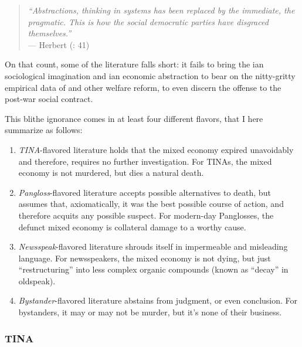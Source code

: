 \begin{quote}
	\emph{``Abstractions, thinking in systems has been replaced by the immediate, the pragmatic. This is how the social democratic parties have disgraced themselves.''}\\
	--- Herbert \citeauthor{Schui2009} (\citeyear{Schui2009}: 41)
\end{quote}

On that count, some of the literature falls short: it fails to bring the \citeauthor{Mills-1959-aa}ian sociological imagination and \citeauthor{Keynes1936}ian economic abstraction to bear on the nitty-gritty empirical data of  and other welfare reform, to even discern  the offense to the post-war social contract. %

This blithe ignorance comes in at least four different flavors, that I here summarize as follows:
\begin{enumerate}
	\item \emph{TINA}-flavored literature holds that the mixed economy expired unavoidably and therefore, requires no further investigation. For TINAs, the mixed economy is not murdered, but dies a natural death.
	\item \emph{Pangloss}-flavored literature accepts possible alternatives to death, but assumes that, axiomatically, it was the best possible course of action, and therefore acquits any possible suspect. For modern-day Panglosses, the defunct mixed economy is collateral damage to a worthy cause.
	\item \emph{Newsspeak}-flavored literature shrouds itself in impermeable and misleading language. For newsspeakers, the mixed economy is not dying, but just ``restructuring'' into less complex organic compounds (known as ``decay'' in oldspeak).
	\item \emph{Bystander}-flavored literature abstains from judgment, or even conclusion. For bystanders, it may or may not be murder, but it's none of their business. %
\end{enumerate}

\subsubsection{TINA}

